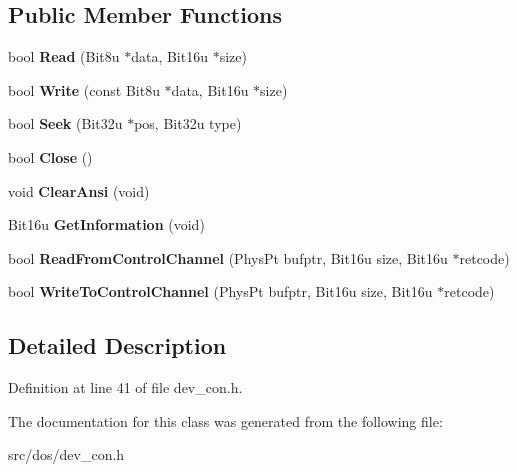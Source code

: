 \subsection*{Public Member Functions}
\begin{DoxyCompactItemize}
\item 
\hypertarget{classdevice__CON_a748000d06f15adcb17f329e32eda83fb}{bool {\bfseries Read} (Bit8u $\ast$data, Bit16u $\ast$size)}\label{classdevice__CON_a748000d06f15adcb17f329e32eda83fb}

\item 
\hypertarget{classdevice__CON_a46c071095c3de95fa316d90c5443fd5f}{bool {\bfseries Write} (const Bit8u $\ast$data, Bit16u $\ast$size)}\label{classdevice__CON_a46c071095c3de95fa316d90c5443fd5f}

\item 
\hypertarget{classdevice__CON_a6d744c09531d7691b538a7f13b3cef7a}{bool {\bfseries Seek} (Bit32u $\ast$pos, Bit32u type)}\label{classdevice__CON_a6d744c09531d7691b538a7f13b3cef7a}

\item 
\hypertarget{classdevice__CON_a69784b10d975098ba5fd46dc4cf33593}{bool {\bfseries Close} ()}\label{classdevice__CON_a69784b10d975098ba5fd46dc4cf33593}

\item 
\hypertarget{classdevice__CON_acf82cb98642a058ba380f15492cb8833}{void {\bfseries Clear\-Ansi} (void)}\label{classdevice__CON_acf82cb98642a058ba380f15492cb8833}

\item 
\hypertarget{classdevice__CON_a8db295befbc8bf8ba25504e65241a4fe}{Bit16u {\bfseries Get\-Information} (void)}\label{classdevice__CON_a8db295befbc8bf8ba25504e65241a4fe}

\item 
\hypertarget{classdevice__CON_aed3d4935317137834c51fbba69221c8f}{bool {\bfseries Read\-From\-Control\-Channel} (Phys\-Pt bufptr, Bit16u size, Bit16u $\ast$retcode)}\label{classdevice__CON_aed3d4935317137834c51fbba69221c8f}

\item 
\hypertarget{classdevice__CON_a6b8675aaab24d4ceeed07a669b8bb512}{bool {\bfseries Write\-To\-Control\-Channel} (Phys\-Pt bufptr, Bit16u size, Bit16u $\ast$retcode)}\label{classdevice__CON_a6b8675aaab24d4ceeed07a669b8bb512}

\end{DoxyCompactItemize}


\subsection{Detailed Description}


Definition at line 41 of file dev\-\_\-con.\-h.



The documentation for this class was generated from the following file\-:\begin{DoxyCompactItemize}
\item 
src/dos/dev\-\_\-con.\-h\end{DoxyCompactItemize}
